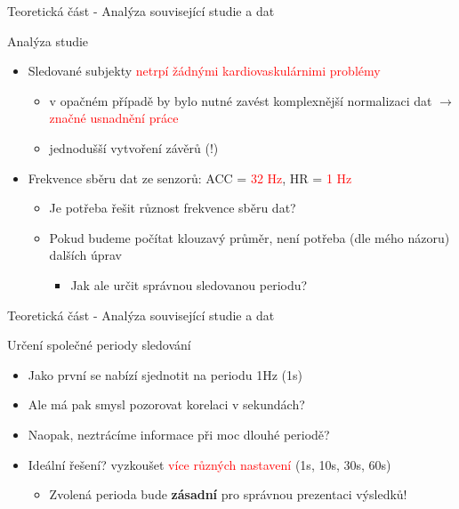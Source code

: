 \documentclass[aspectratio=169, xcolor=dvipsnames]{beamer}
\begin{document}
\begin{frame}{Teoretická část - Analýza související studie a dat}
	\begin{block}{Analýza studie}
    \pause
		\begin{itemize}
      \item Sledované subjekty \textcolor{Red}{netrpí žádnými kardiovaskulárnimi problémy}
        \pause
        \begin{itemize}
          \item v opačném případě by bylo nutné zavést komplexnější normalizaci dat $\to$ \textcolor{Red}{značné usnadnění práce}
          \item jednodušší vytvoření závěrů (!)
        \end{itemize}
      \pause
      \item Frekvence sběru dat ze senzorů: ACC = \textcolor{Red}{32 Hz}, HR = \textcolor{Red}{1 Hz} 
        \pause
        \begin{itemize}
          \item Je potřeba řešit různost frekvence sběru dat?
            \pause
          \item Pokud budeme počítat klouzavý průměr, není potřeba (dle mého názoru) dalších úprav 
            \begin{itemize}
              \item Jak ale určit správnou sledovanou periodu? 
            \end{itemize}
        \end{itemize}
    \end{itemize}
	\end{block}
\end{frame}

\begin{frame}{Teoretická část - Analýza související studie a dat}
  \begin{block}{Určení společné periody sledování}
    \begin{itemize}
        \pause
      \item Jako první se nabízí sjednotit na periodu 1Hz (1s)
        \pause
      \item Ale má pak smysl pozorovat korelaci v sekundách? 
        \pause
      \item Naopak, neztrácíme informace při moc dlouhé periodě? 
        \pause
      \item Ideální řešení? \pause vyzkoušet \textcolor{Red}{více různých nastavení} (1s, 10s, 30s, 60s)
        \pause
        \begin{itemize}
          \item Zvolená perioda bude \textbf{zásadní} pro správnou prezentaci výsledků!
        \end{itemize}
    \end{itemize} 
  \end{block} 
\end{frame}
\end{document}
